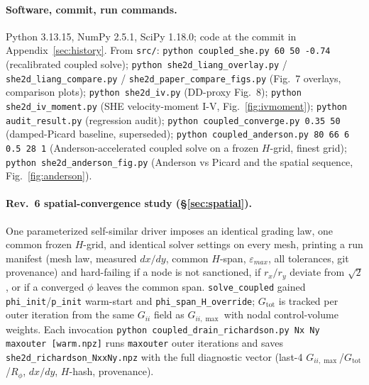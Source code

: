 \documentclass[11pt]{article}
\newcommand{\eps}{\varepsilon}
\begin{document}
\paragraph{Software, commit, run commands.} Python 3.13.15, NumPy 2.5.1, SciPy 1.18.0; code at the
commit in Appendix~\ref{sec:history}. From \texttt{src/}: \texttt{python coupled\_she.py 60 50
-0.74} (recalibrated coupled solve); \texttt{python she2d\_liang\_overlay.py} /
\texttt{she2d\_liang\_compare.py} / \texttt{she2d\_paper\_compare\_figs.py} (Fig.~7 overlays,
comparison plots); \texttt{python she2d\_iv.py} (DD-proxy Fig.~8); \texttt{python she2d\_iv\_moment.py} (SHE
velocity-moment I-V, Fig.~\ref{fig:ivmoment}); \texttt{python audit\_result.py} (regression audit);
\texttt{python coupled\_converge.py 0.35 50} (damped-Picard baseline, superseded);
\texttt{python coupled\_anderson.py 80 66 6 0.5 28 1} (Anderson-accelerated coupled solve on a
frozen $H$-grid, finest grid); \texttt{python she2d\_anderson\_fig.py} (Anderson vs Picard and the
spatial sequence, Fig.~\ref{fig:anderson}).

\paragraph{Rev.~6 spatial-convergence study (\S\ref{sec:spatial}).} One parameterized self-similar
driver imposes an identical grading law, one common frozen $H$-grid, and identical solver settings on
every mesh, printing a run manifest (mesh law, measured $dx/dy$, common $H$-span, $\eps_{max}$, all
tolerances, git provenance) and hard-failing if a node is not sanctioned, if $r_x/r_{y}$ deviate from
$\sqrt2$, or if a converged $\phi$ leaves the common span. \texttt{solve\_coupled} gained
\texttt{phi\_init}/\texttt{p\_init} warm-start and \texttt{phi\_span\_H\_override}; $G_{\mathrm{tot}}$
is tracked per outer iteration from the same $G_{ii}$ field as $G_{ii,\max}$ with nodal
control-volume weights. Each invocation \texttt{python coupled\_drain\_richardson.py Nx Ny
maxouter [warm.npz]} runs \texttt{maxouter} outer iterations and saves
\texttt{she2d\_richardson\_NxxNy.npz} with the full diagnostic vector (last-4
$G_{ii,\max}$/$G_{\mathrm{tot}}$/$R_\phi$, $dx/dy$, $H$-hash, provenance).
\end{document}
